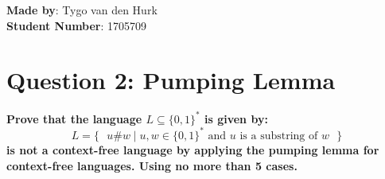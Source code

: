 \documentclass[a4paper]{article}
\begin{document}
    \setlength{\parskip}{0.5em}
    \setlength{\parindent}{0cm}
    \textbf{Made by}: Tygo van den Hurk \\
    \textbf{Student Number}: 1705709 \\
    \section*{Question 2: Pumping Lemma}
        \textbf{Prove that the language $L \subseteq \{0,1\}^\ast$ is given by:}
        \begin{displaymath} %
            L = \{\text{ }
                u\#w  \mid u, w \in \{0, 1\}^* \text{ and } u \text{ is a substring of } w
            \text{ }\}
        \end{displaymath}
        \textbf{is not a context-free language by applying the pumping lemma for context-free languages. Using no more than 5 cases.}
        \medskip
\end{document}
